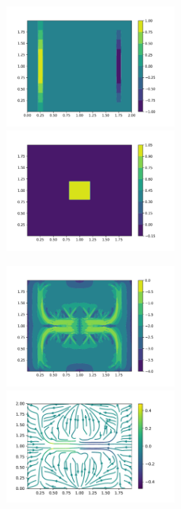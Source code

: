 \documentclass[letterpaper,12pt]{article}
\theoremstyle{plain}
\theoremstyle{remark}
\theoremstyle{remark}
\theoremstyle{remark}
\numberwithin{equation}{section}
\begin{document}
\begin{figure}
  \includegraphics[width=0.5\textwidth]{4/m1}
  \includegraphics[width=0.5\textwidth]{4/s}
\end{figure}
\begin{figure}
  \includegraphics[width=0.5\textwidth]{4/PCG}
  \includegraphics[width=0.5\textwidth]{4/vector}
\end{figure}
\end{document}
